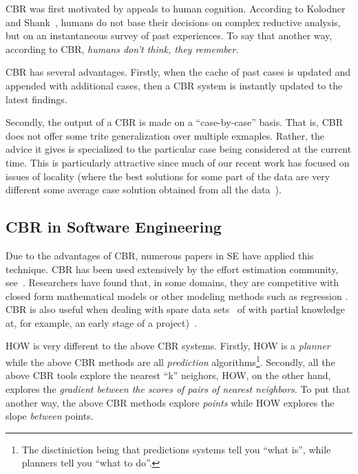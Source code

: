 \documentclass[conference]{IEEEtran}
\begin{document}
CBR was first motivated by appeals to human cognition. According to 
Kolodner~\cite{Kolodner1992} and Shank~\cite{Schank1977},
humans do not base their decisions
on complex reductive analysis, but on an instantaneous survey of past experiences.
To say that   another way, according  to  CBR, 
{\em humans  don’t
think,  they remember.}



CBR has several advantages.
Firstly,
when the  cache of past cases is  updated and appended with additional cases, then a CBR system is instantly updated
to the latest findings.  

Secondly, the output of a CBR is made on a ``case-by-case'' basis. 
That is, CBR does not offer some trite generalization over multiple
exmaples. Rather, the advice it gives is specialized to the particular
case being considered at the current time.  This is particularly attractive
since much of our recent work has focused on issues
of locality (where the best solutions for some part of the data
are very different some average case solution obtained from all the data~\cite{localvsglobal}).  

\subsection{CBR in Software Engineering}
Due to the advantages of CBR, numerous papers in SE
have applied this technique.    CBR  has been used extensively by the effort estimation community, see~\cite{keung2008analogy, 6600685, walkerden1999empirical, shepperd1997estimating, kocaguneli2010use}. 
Researchers have found that, in some domains, they are competitive with  closed form mathematical models or other modeling methods such as regression \cite{keung2008analogy}. 
CBR is also useful when dealing with spare data sets~\cite{1438374} of with 
partial knowledge  at, for example,  an early stage of a project)~\cite{walkerden1999empirical}. 

 HOW    is very different
to the above CBR systems.
Firstly, HOW is a {\em planner} while the above
CBR methods are all {\em prediction} algorithms\footnote{The disctiniction being that
predictions systems tell you ``what is'', while planners tell you ``what to do''.}.
Secondly, all the above CBR tools explore the nearest ``k'' neighors,
HOW, on the other hand,  explores the {\em gradient between the scores of pairs of nearest neighbors}. 
To put that
another way,   the above CBR methods explore {\em points} while
HOW explores the slope {\em between} points.
 
\end{document}

